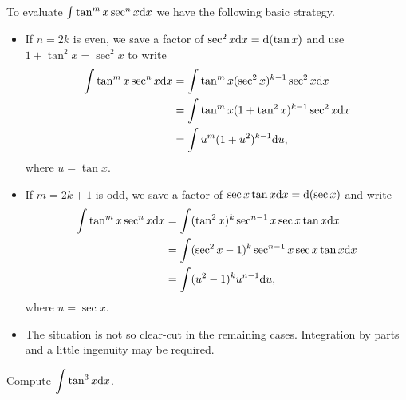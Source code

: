 \begin{remark}
To evaluate $\int\tan^m x\sec^n x\mathrm{d} x$ we have the following basic strategy.
\begin{itemize}
\item If $n=2k$ is even, we save a factor of $\sec^2 x\mathrm{d} x = \mathrm{d}(\tan x)$ and use $1+\tan^2 x = \sec^2 x$ to write
\begin{equation*}
\begin{split}
\int\tan^m x\sec^n x\mathrm{d} x &= \int\tan^m x(\sec^2 x)^{k-1}\sec^2 x\mathrm{d} x\\
&= \int\tan^m x(1+\tan^2 x)^{k-1}\sec^2 x\mathrm{d} x\\
&= \int u^m (1+u^2)^{k-1}\mathrm{d} u,
\end{split}
\end{equation*}
where $u=\tan x$.
\item If $m=2k+1$ is odd, we save a factor of $\sec x\tan x\mathrm{d} x = \mathrm{d}(\sec x)$ and write
\begin{equation*}
\begin{split}
\int\tan^m x\sec^n x\mathrm{d} x &= \int (\tan^{2} x)^k\sec^{n-1} x\sec x\tan x\mathrm{d} x\\
&= \int (\sec^{2} x -1)^k\sec^{n-1} x\sec x\tan x\mathrm{d} x\\
&= \int (u^2 -1)^ku^{n-1} \mathrm{d} u,
\end{split}
\end{equation*}
where $u=\sec x$.
\item The situation is not so clear-cut in the remaining cases.
Integration by parts and a little ingenuity may be required.
\end{itemize}
\end{remark}

\begin{example}
Compute $\displaystyle\int\tan^3 x\mathrm{d} x$.
\end{example}
\ifdefined\SOLUTION
{}
\else
\fi
\vfill

